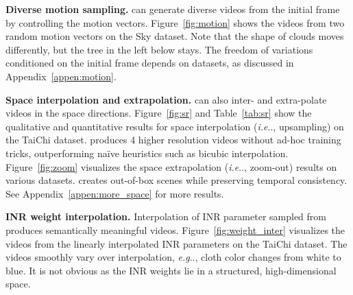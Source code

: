 \documentclass{article} \usepackage{iclr2022_conference,times}
\makeatletter
\DeclareRobustCommand\onedot{\futurelet\@let@token\@onedot}
\def\@onedot{\ifx\@let@token.\else.\null\fi\xspace}
\def\eg{\emph{e.g}\onedot} \def\Eg{\emph{E.g}\onedot}
\def\ie{\emph{i.e}\onedot} \def\Ie{\emph{I.e}\onedot}
\makeatother
\begin{document}
\textbf{Diverse motion sampling.}
\sname can generate diverse videos from the initial frame by controlling the motion vectors. Figure~\ref{fig:motion} shows the videos from two random motion vectors on the Sky dataset. Note that the shape of clouds moves differently, but the tree in the left below stays. The freedom of variations conditioned on the initial frame depends on datasets, as discussed in Appendix~\ref{appen:motion}.

\textbf{Space interpolation and extrapolation.}
\sname can also inter- and extra-polate videos in the space directions. Figure~\ref{fig:sr} and Table~\ref{tab:sr} show the qualitative and quantitative results for space interpolation (\ie, upsampling) on the TaiChi dataset. \sname produces 4 higher resolution videos without ad-hoc training tricks, outperforming na\"ive heuristics such as bicubic interpolation. Figure~\ref{fig:zoom} visualizes the space extrapolation (\ie, zoom-out) results on various datasets. \sname creates out-of-box scenes while preserving temporal consistency. See Appendix~\ref{appen:more_space} for more results.

\textbf{INR weight interpolation.}
Interpolation of INR parameter sampled from \sname produces semantically meaningful videos. Figure~\ref{fig:weight_inter} visualizes the videos from the linearly interpolated INR parameters on the TaiChi dataset. The videos smoothly vary over interpolation, \eg, cloth color changes from white to blue. It is not obvious as the INR weights lie in a structured, high-dimensional space.
\end{document}
